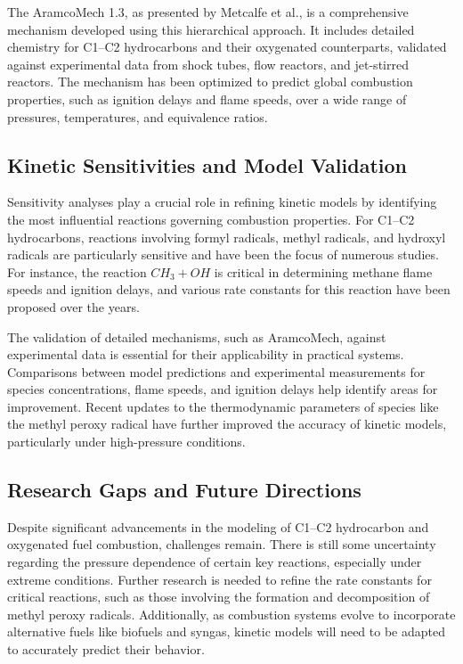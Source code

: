\documentclass[12pt]{report}
\begin{document}
The AramcoMech 1.3, as presented by Metcalfe et al., is a comprehensive mechanism developed using this hierarchical approach. It includes detailed chemistry for C1–C2 hydrocarbons and their oxygenated counterparts, validated against experimental data from shock tubes, flow reactors, and jet-stirred reactors. The mechanism has been optimized to predict global combustion properties, such as ignition delays and flame speeds, over a wide range of pressures, temperatures, and equivalence ratios.

\subsection{Kinetic Sensitivities and Model Validation}
Sensitivity analyses play a crucial role in refining kinetic models by identifying the most influential reactions governing combustion properties. For C1–C2 hydrocarbons, reactions involving formyl radicals, methyl radicals, and hydroxyl radicals are particularly sensitive and have been the focus of numerous studies. For instance, the reaction \( CH_3 + OH \) is critical in determining methane flame speeds and ignition delays, and various rate constants for this reaction have been proposed over the years.

The validation of detailed mechanisms, such as AramcoMech, against experimental data is essential for their applicability in practical systems. Comparisons between model predictions and experimental measurements for species concentrations, flame speeds, and ignition delays help identify areas for improvement. Recent updates to the thermodynamic parameters of species like the methyl peroxy radical have further improved the accuracy of kinetic models, particularly under high-pressure conditions.

\subsection{Research Gaps and Future Directions}
Despite significant advancements in the modeling of C1–C2 hydrocarbon and oxygenated fuel combustion, challenges remain. There is still some uncertainty regarding the pressure dependence of certain key reactions, especially under extreme conditions. Further research is needed to refine the rate constants for critical reactions, such as those involving the formation and decomposition of methyl peroxy radicals. Additionally, as combustion systems evolve to incorporate alternative fuels like biofuels and syngas, kinetic models will need to be adapted to accurately predict their behavior.
\end{document}
